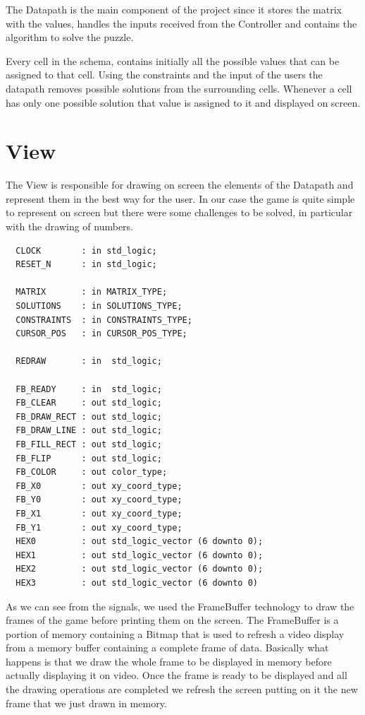 \documentclass[12pt]{report}
\begin{document}
The Datapath is the main component of the project since it stores the
matrix with the values, handles the inputs received from the Controller
and contains the algorithm to solve the puzzle.

Every cell in the schema, contains initially all the possible values that
can be assigned to that cell. Using the constraints and the input of the
users the datapath removes possible solutions from the surrounding cells.
Whenever a cell has only one possible solution that value is assigned to
it and displayed on screen.

\newpage

\section*{View}

The View is responsible for drawing on screen the elements of the Datapath
and represent them in the best way for the user. In our case the game is
quite simple to represent on screen but there were some challenges to be
solved, in particular with the drawing of numbers.

\begin{center}
\begin{minipage}{0.5\textwidth}
\begin{verbatim}
  CLOCK        : in std_logic;
  RESET_N      : in std_logic;

  MATRIX       : in MATRIX_TYPE;
  SOLUTIONS    : in SOLUTIONS_TYPE;
  CONSTRAINTS  : in CONSTRAINTS_TYPE;
  CURSOR_POS   : in CURSOR_POS_TYPE;

  REDRAW       : in  std_logic;

  FB_READY     : in  std_logic;
  FB_CLEAR     : out std_logic;
  FB_DRAW_RECT : out std_logic;
  FB_DRAW_LINE : out std_logic;
  FB_FILL_RECT : out std_logic;
  FB_FLIP      : out std_logic;
  FB_COLOR     : out color_type;
  FB_X0        : out xy_coord_type;
  FB_Y0        : out xy_coord_type;
  FB_X1        : out xy_coord_type;
  FB_Y1        : out xy_coord_type;
  HEX0         : out std_logic_vector (6 downto 0);
  HEX1         : out std_logic_vector (6 downto 0);
  HEX2         : out std_logic_vector (6 downto 0);
  HEX3         : out std_logic_vector (6 downto 0)
\end{verbatim}
\end{minipage}
\end{center}

As we can see from the signals, we used the FrameBuffer technology to draw
the frames of the game before printing them on the screen. The FrameBuffer
is a portion of memory containing a Bitmap that is used to refresh a video
display from a memory buffer containing a complete frame of data.
Basically what happens is that we draw the whole frame to be displayed in
memory before actually displaying it on video. Once the frame is ready to
be displayed and all the drawing operations are completed we refresh the
screen putting on it the new frame that we just drawn in memory.
\end{document}

